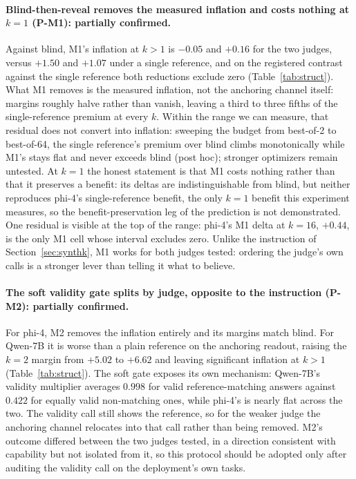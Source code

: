 \documentclass[11pt]{article}
\begin{document}
\paragraph{Blind-then-reveal removes the measured inflation and costs nothing at $k{=}1$ (P-M1): partially confirmed.}
Against blind, M1's inflation at $k > 1$ is $-0.05$ and $+0.16$ for the two judges, versus $+1.50$ and $+1.07$ under a single reference, and on the registered contrast against the single reference both reductions exclude zero (Table~\ref{tab:struct}).
What M1 removes is the measured inflation, not the anchoring channel itself: margins roughly halve rather than vanish, leaving a third to three fifths of the single-reference premium at every $k$.
Within the range we can measure, that residual does not convert into inflation: sweeping the budget from best-of-2 to best-of-64, the single reference's premium over blind climbs monotonically while M1's stays flat and never exceeds blind (post hoc); stronger optimizers remain untested.
At $k{=}1$ the honest statement is that M1 costs nothing rather than that it preserves a benefit: its deltas are indistinguishable from blind, but neither reproduces phi-4's single-reference benefit, the only $k{=}1$ benefit this experiment measures, so the benefit-preservation leg of the prediction is not demonstrated.
One residual is visible at the top of the range: phi-4's M1 delta at $k{=}16$, $+0.44$, is the only M1 cell whose interval excludes zero.
Unlike the instruction of Section~\ref{sec:synthk}, M1 works for both judges tested: ordering the judge's own calls is a stronger lever than telling it what to believe.

\paragraph{The soft validity gate splits by judge, opposite to the instruction (P-M2): partially confirmed.}
For phi-4, M2 removes the inflation entirely and its margins match blind.
For Qwen-7B it is worse than a plain reference on the anchoring readout, raising the $k{=}2$ margin from $+5.02$ to $+6.62$ and leaving significant inflation at $k > 1$ (Table~\ref{tab:struct}).
The soft gate exposes its own mechanism: Qwen-7B's validity multiplier averages $0.998$ for valid reference-matching answers against $0.422$ for equally valid non-matching ones, while phi-4's is nearly flat across the two.
The validity call still shows the reference, so for the weaker judge the anchoring channel relocates into that call rather than being removed.
M2's outcome differed between the two judges tested, in a direction consistent with capability but not isolated from it, so this protocol should be adopted only after auditing the validity call on the deployment's own tasks.
\end{document}
